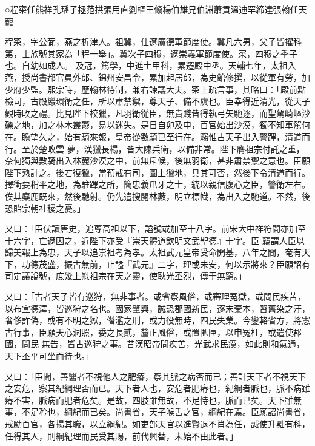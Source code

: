 
\begin{pinyinscope}

 ○程寀任熊祥孔璠子拯范拱張用直劉樞王翛楊伯雄兄伯淵蕭貢溫迪罕締達張翰任天寵



 程寀，字公弼，燕之析津人。祖冀，仕遼廣德軍節度使。冀凡六男，父子皆擢科第，士族號其家為「程一舉」。冀次子四穆，遼崇義軍節度使。寀，四穆之季子也。自幼如成人。
 及冠，篤學，中進士甲科，累遷殿中丞。天輔七年，太祖入燕，授尚書都官員外郎、錦州安昌令，累加起居郎，為史館修撰，以從軍有勞，加少府少監。熙宗時，歷翰林待制，兼右諫議大夫。寀上疏言事，其略曰：「殿前點檢司，古殿巖環衛之任，所以肅禁禦，尊天子、備不虞也。臣幸得近清光，從天子觀時畋之禮。比見陛下校獵，凡羽衛從臣，無貴賤皆得執弓矢馳逐，而聖駕崎嶇沙礫之地，加之林木叢鬱，易以迷失。是日自卯及申，百官始出沙漠，獨不知車駕何在。瞻望久之，始有騎來報，皇帝從數騎已至行在。竊惟古天子出入警蹕，清道而行。至於楚畋雲
 夢，漢獵長楊，皆大陳兵衛，以備非常。陛下膺祖宗付託之重，奈何獨與數騎出入林麓沙漠之中，前無斥候，後無羽衛，甚非肅禁禦之意也。臣願陛下熟計之。後若復獵，當預戒有司，圖上獵地，具其可否，然後下令清道而行。擇衝要稍平之地，為駐蹕之所，簡忠義爪牙之士，統以親信腹心之臣，警衛左右。俟其麋鹿既來，然後馳射。仍先遣搜閱林藪，明立標幟，為出入之馳道。不然，後恐貽宗朝社稷之憂。」



 又曰：「臣伏讀唐史，追尊高祖以下，謚號或加至十八字。前宋大中祥符間亦加至十六字，亡遼因之，近陛下亦受『崇天體道欽明文武聖德』十字。臣
 竊謂人臣以歸美報上為忠，天子以追崇祖考為孝。太祖武元皇帝受命開基，八年之間，奄有天下，功德茂盛，振古無前，止謚『武元』二字，理或未安，何以示將來？臣願詔有司定議謚號，庶幾上慰祖宗在天之靈，使耿光丕烈，傳于無窮。」



 又曰：「古者天子皆有巡狩，無非事者。或省察風俗，或審理冤獄，或問民疾苦，以布宣德澤，皆巡狩之名也。國家肇興，誠恐郡國新民，逐末棄本，習舊染之汙，奢侈詐偽，或有不明之獄，僭濫之刑，或力役無時，四民失業。今鑾輅省方，將憲古行事，臣願天心洞照，委之長貳，釐正風俗，或置匭匣，以申冤枉，或遣使郡國，問民
 無告，皆古巡狩之事。昔漢昭帝問疾苦，光武求民瘼，如此則和氣通，天下丕平可坐而待也。」



 又曰：「臣聞，善醫者不視他人之肥瘠，察其脈之病否而已；善計天下者不視天下之安危，察其紀綱理否而已。天下者人也，安危者肥瘠也，紀綱者脈也，脈不病雖瘠不害，脈病而肥者危矣。是故，四肢雖無故，不足恃也，脈而已矣。天下雖無事，不足矜也，綱紀而已矣。尚書省，天子喉舌之官，綱紀在焉。臣願詔尚書省，戒勵百官，各揚其職，以立綱紀。如吏部天官以進賢退不肖為任，誠使升黜有科，任得其人，則綱紀理而民受其賜，前代興替，未始不由此者。」




\end{pinyinscope}
